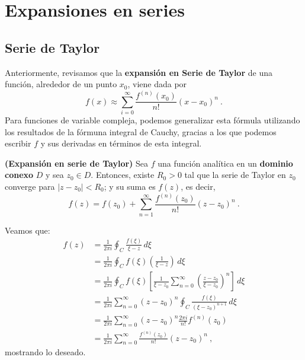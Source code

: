 \section{Expansiones en series}

\subsection{Serie de Taylor}

Anteriormente, revisamos que la \textbf{expansión en Serie de Taylor} de una función, alrededor de un punto $x_0$, viene dada por 
\begin{equation}
    f(x) \approx \sum_{i=0}^\infty \frac{f^{(n)}(x_0)}{n!} (x-x_0)^n \ .
\end{equation}
Para funciones de variable compleja, podemos generalizar esta fórmula utilizando los resultados de la fórmuna integral de Cauchy, gracias a los que podemos escribir $f$ y sus derivadas en términos de esta integral.

\begin{teorema}{\textbf{(Expansión en serie de Taylor)}}
    Sea $f$ una función analítica en un \textbf{dominio conexo} $D$ y sea $z_0 \in D$. Entonces, existe $R_0 > 0$ tal que la serie de Taylor en $z_0$ converge para $|z-z_0| < R_0$; y su suma es $f(z)$, es decir,
    \begin{equation}
        f(z) = f(z_0) + \sum_{n=1}^\infty \frac{f^{(n)}(z_0)}{n!} (z-z_0)^n \ .
    \end{equation}
\end{teorema}

\begin{demo}
    Veamos que:
    \begin{align*}
        f(z) & = \frac{1}{2\pi i} \oint_C \frac{f(\xi)}{\xi - z} \, d\xi \\
        & = \frac{1}{2\pi i} \oint_C f(\xi) \left(\frac{1}{\xi - z}\right) \, d\xi \\
        & = \frac{1}{2\pi i} \oint_C f(\xi) \left[ \frac{1}{\xi - z_0} \sum_{n=0}^\infty \left(\frac{z-z_0}{\xi-z_0}\right)^n  \right] \, d\xi \\
        & = \frac{1}{2\pi i} \sum_{n=0}^\infty (z-z_0)^n \oint_C \frac{f(\xi)}{(\xi-z_0)^{n+1}} \, d\xi \\
        & = \frac{1}{2\pi i} \sum_{n=0}^\infty (z-z_0)^n \frac{2\pi i}{n!} f^{(n)}(z_0) \\
        & = \frac{1}{2\pi i} \sum_{n=0}^\infty \frac{f^{(n)}(z_0)}{n!} (z-z_0)^n \ ,
    \end{align*}
    mostrando lo deseado.
\end{demo}

